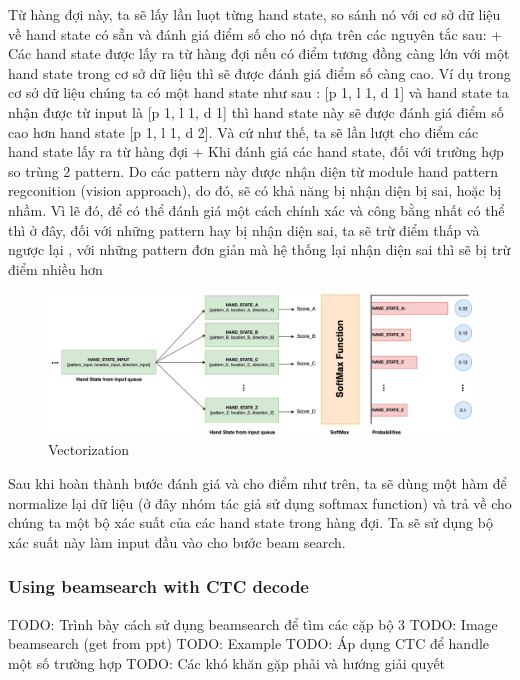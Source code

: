       Từ hàng đợi này, ta sẽ lấy lần luọt từng hand state, so sánh nó với cơ sở dữ liệu về hand state có sẵn 
      và đánh giá điểm số cho nó dựa trên các nguyên tắc sau:
        + Các hand state được lấy ra từ hàng đợi nếu có điểm tương đồng càng lớn với một hand state
        trong cơ sở dữ liệu thì sẽ được đánh giá điểm số càng cao. Ví dụ trong cơ sở dữ liệu chúng ta
        có một hand state như sau : [p 1, l 1, d 1] và hand state ta nhận được từ input là [p 1, l 1, d 1] thì hand state này sẽ
        được đánh giá điểm số cao hơn hand state [p 1, l 1, d 2]. Và cứ như thế, ta sẽ lần lượt cho điểm các hand state lấy ra từ hàng đợi
        + Khi đánh giá các hand state, đối với trường hợp so trùng 2 pattern. Do các pattern này được nhận diện từ module
        hand pattern regconition (vision approach), do đó, sẽ có khả năng bị nhận diện bị sai, hoặc bị nhầm. Vì lẽ đó, để có thể
        đánh giá một cách chính xác và công bằng nhất có thể thì ở đây, đối với những pattern hay bị nhận diện sai, ta sẽ trừ điểm thấp và ngược lại
        , với những pattern đơn giản mà hệ thống lại nhận diện sai thì sẽ bị trừ điểm nhiều hơn
        
      \begin{figure}[H]
        \centering
        \includegraphics[width=\textwidth]{img/Chap4/Vectorization.png}
        \caption{ Vectorization }
        \label{fig:Chap4-Vectorization }
      \end{figure}



      Sau khi hoàn thành bước đánh giá và cho điểm như trên, ta sẽ dùng một hàm để normalize
      lại dữ liệu (ở đây nhóm tác giả sử dụng softmax function) và trả về cho chúng ta một bộ xác suất của các hand state trong hàng đợi. Ta sẽ sử dụng bộ xác suất này
      làm input đầu vào cho bước beam search.
    \subsubsection{ Using beamsearch with CTC decode }
      TODO: Trình bày cách sử dụng beamsearch để tìm các cặp bộ 3
      TODO: Image beamsearch (get from ppt)
      TODO: Example
      TODO: Áp dụng CTC để handle một số trường hợp
      TODO: Các khó khăn gặp phải và hướng giải quyết
      
